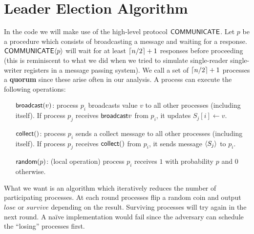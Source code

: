 \documentclass[
10pt, %
a4paper, %
onecolumn, %
]{article}
\begin{document}

\section{Leader Election Algorithm}
In the code we will make use of the high-level protocol $\mathsf{COMMUNICATE}$. Let $p$ be a procedure which consists of broadcasting a message and waiting for a response. $\mathsf{COMMUNICATE}\langle p\rangle$ will wait for at least $\lceil n/2\rceil+1$ responses before proceeding (this is reminiscent to what we did when we tried to simulate single-reader single-writer registers in a message passing system). We call a set of $\lceil n/2\rceil+1$ processes a \textbf{quorum} since these arise often in our analysis. A process can execute the following operations:
\begin{enumerate}
\item[$\mathsf{broadcast}(v)$:] process $p_i$ broadcasts value $v$ to all other processes (including itself). If process $p_j$ receives $\mathsf{broadcast}{v}$ from $p_i$, it updates $S_j[i] \leftarrow v$.
\item[$\mathsf{collect}()$:] process $p_i$ sends a collect message to all other processes (including itself). If process $p_j$ receives $\mathsf{collect}()$ from $p_i$, it sends message $\langle S_j\rangle$ to $p_i$. 
\item[$\mathsf{random}(p)$:] (local operation) process $p_i$ receives $1$ with probability $p$ and $0$ otherwise. 
\end{enumerate}

What we want is an algorithm which iteratively reduces the number of participating processes. At each round processes flip a random coin and output $lose$ or $survive$ depending on the result. Surviving processes will try again in the next round. A na\"{i}ve implementation would fail since the adversary can schedule the ``losing'' processes first.
\end{document}
